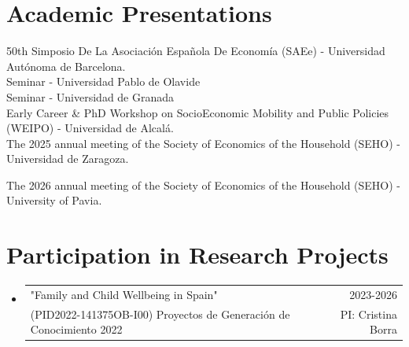 \documentclass[letterpaper,11pt]{article}
\makeatletter
\newcommand{\resumeSubheading}[4]{
  \vspace{-1pt}\item
    \begin{tabular*}{0.97\textwidth}{l@{\extracolsep{\fill}}r}
      \textbf{#1} & #2 \\
      \textit{\small#3} & \textit{\small #4} \\
    \end{tabular*}\vspace{-5pt}
}
\newcommand{\resumeSubHeadingListStart}{\begin{itemize}[leftmargin=*, label={}]}
\newcommand{\resumeSubHeadingListEnd}{\end{itemize}}
\makeatother
\begin{document}
\section{Academic Presentations}
\begin{description}[leftmargin=!, labelwidth=2.5cm]

\item[2025]
50th Simposio De La Asociación Española De Economía (SAEe) - Universidad Autónoma de Barcelona. \\
Seminar - Universidad Pablo de Olavide  \\
Seminar - Universidad de Granada \\
Early Career \& PhD Workshop on SocioEconomic Mobility and Public Policies (WEIPO) - Universidad de Alcalá. \\
The 2025 annual meeting of the Society of Economics of the Household (SEHO) - Universidad de Zaragoza.
\item[2026]
The 2026 annual meeting of the Society of Economics of the Household (SEHO) - University of Pavia.

\end{description}

\section{Participation in Research Projects}

\let\oldresumeSubheading\resumeSubheading
\renewcommand{\resumeSubheading}[4]{
  \vspace{-1pt}\item
    \begin{tabular*}{0.97\textwidth}{l@{\extracolsep{\fill}}r}
      #1 & #2 \\
      #3 & #4 \\
    \end{tabular*}\vspace{-5pt}
}

\resumeSubHeadingListStart

  \resumeSubheading
    {"Family and Child Wellbeing in Spain"}{2023-2026}
    {(PID2022-141375OB-I00) Proyectos de Generación de Conocimiento 2022}{PI: Cristina Borra}

\resumeSubHeadingListEnd

\let\resumeSubheading\oldresumeSubheading

\end{document}
